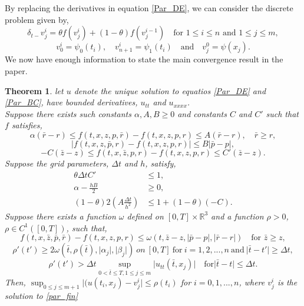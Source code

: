 \documentclass[12pt]{article}
\newcommand{\R}{\mathbb{R}}
\newtheorem{theorem}{Theorem}
\theoremstyle{definition}
\begin{document}
By replacing the derivatives in equation \ref{Par_DE}, we can consider the discrete problem given by,
\begin{equation}
\delta_{t-}v^i_j=\theta f(v^i_j)+(1-\theta)f(v^{i-1}_j) \quad \text{for	} 1\leq i\leq n \text{ and } 1\leq j\leq m, \label{par_fin}
\end{equation}
\begin{equation}
v_0^i=\psi_0(t_i), \quad v_{n+1}^i=\psi_1(t_i) \quad \textrm{and} \quad v^0_j=\psi(x_j).
\end{equation}
We now have enough information to state the main convergence result in the paper.


\begin{theorem}
let $u$ denote the unique solution to equatios \ref{Par_DE} and \ref{Par_BC}, have bounded derivatives, $u_{tt}$ and $u_{xxxx}$.\\ 
Suppose there exists such constants $\alpha,A, B \geq 0$ and constants $C$ and $C'$ such that $f$ satisfies,
\begin{equation}
\alpha\left(\bar{r}-r\right)\leq f(t,x,z,p,\bar{r})-f(t,x,z,p,r)\leq A(\bar{r}-r), \quad \bar{r}\geq r,
\end{equation}
\begin{equation}
\lvert f(t,x,z,\bar{p},r)-f(t,x,z,p,r)\rvert\leq B\lvert\bar{p}-p\rvert,
\end{equation}
\begin{equation}
-C\left(\bar{z}-z\right)\leq f(t,x,\bar{z},p,r)-f(t,x,z,p,r)\leq C'(\bar{z}-z). 
\end{equation}
Suppose the grid parameters, $\Delta t$ and $h$, satisfy,
\begin{align}
\theta \Delta tC'&\leq 1,\\
\alpha-\frac{hB}{2}&\geq 0,\\
\left(1-\theta\right)2\left(A\frac{\Delta t}{h^2}\right) &\leq 1+\left( 1-\theta\right)\left(-C\right).
\end{align}
Suppose there exists a function $\omega$ defined on $[0,T]\times \R^3$ and a function $\rho >0$, $\rho\in C^1([0,T])$, such that,
\begin{equation}
f(t,x,\bar{z},\bar{p},\bar{r})-f(t,x,z,p,r)\leq \omega(t,\bar{z}-z,\lvert \bar{p}-p\rvert,\lvert \bar{r}-r\rvert) \quad \textrm{for } \bar{z}\geq z,
\end{equation}  
\begin{equation}
\rho'(t')\geq 2\omega(\bar{t},\rho(\bar{t}),\lvert \alpha_j\rvert,\lvert \beta_j\rvert) \ on \ [0,T] \ \mathrm{for} \ i=1,2,...,n \ \mathrm{and}\ \lvert \bar{t}-t'\rvert \geq \Delta t,
\end{equation}
\begin{equation}
\rho '(t')> \Delta t \sup_{0<\bar{t}\leq T,1\leq j\leq m} \lvert u_{tt}(\bar{t},x_j)\rvert \quad \mathrm{for} \lvert \bar{t}-t\rvert \leq \Delta t.
\end{equation}
Then, $\sup_{0\leq j \leq m+1}\lvert(u(t_i,x_j)-v^i_j\rvert \leq \rho(t_i)$ for $i=0,1,...,n$, where $v^i_j$ is the solution to \ref{par_fin}

\end{theorem}
\end{document}
